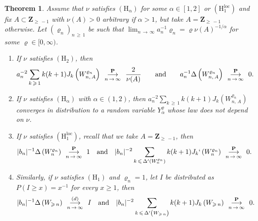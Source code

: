 \documentclass[10pt]{amsart}
\newtheorem{theo}{Theorem}[section]
\theoremstyle{definition}\newtheorem{defi}[theo]{Definition}\newtheorem{rema}[theo]{Remark}\newtheorem{exam}[theo]{Example}\newtheorem{exem}[theo]{Example}\newtheorem{nota}[theo]{Notation}
\newcommand{\ensembles}[1]{\mathbf{#1}}
\newcommand{\Z}{\ensembles{Z}}
\renewcommand{\P}{\ensembles{P}}
\newcommand{\1}{\ensembles{1}}
\renewcommand{\le}{\leqslant}
\renewcommand{\ge}{\geqslant}
\newcommand{\Hrm}{\mathrm{H}}
\newcommand{\Hrmloc}{\mathrm{(H_1^{loc})}}
\newcommand{\Hrmalp}{\mathrm{(H_\alpha)}}
\newcommand{\cvloi}[1][n]{\enskip\mathop{\longrightarrow}^{(d)}_{#1\,\to\, \infty}\enskip}
\newcommand{\cvproba}[1][n]{\enskip\mathop{\longrightarrow}^{\P}_{#1\,\to\, \infty}\enskip}
\providecommand{\?}{}
\begin{document}
\begin{theo}\label{thm:GW}
Assume that $\nu$ satisfies $\Hrmalp$ for some $\alpha \in [1, 2]$ or $\Hrmloc$ and fix $A \subset \Z_{\ge\,-1}$ with $\nu(A) > 0$ arbitrary if $\alpha>1$, but take $A = \Z_{\ge\,-1}$ otherwise. Let $(\varrho_n)_{n\,\ge\,1}$ be such that $\lim_{n\,\to\,\infty} a_n^{-1} \varrho_n = \varrho \nu(A)^{-1/\alpha}$ for some $\varrho \in [0, \infty)$.
\begin{enumerate}
\item\label{thm:GW_Gaussien}
If $\nu$ satisfies $(\Hrm_2)$, then
\[
a_n^{-2} \sum_{k\,\ge\,1} k (k+1) J_k\left(W^{\varrho_n}_{n,\,A}\right) \cvproba \frac{2}{\nu(A)}
\qquad\text{and}\qquad a_n^{-1} \Delta\left(W^{\varrho_n}_{n,\,A}\right) \cvproba 0.
\]

\item\label{thm:GW_stable}
If $\nu$ satisfies $\Hrmalp$ with $\alpha \in (1,2)$, then $a_n^{-2} \sum_{k\,\ge\,1} k (k+1) J_k(W^{\varrho_n}_{n,\,A})$ converges in distribution to a random variable $Y_\alpha^\varrho$ whose law does not depend on $\nu$.

\item\label{thm:GW_Cauchy_loc}
If $\nu$ satisfies $\Hrmloc$, recall that we take $A = \Z_{\ge\,-1}$, then
\[
|b_n|^{-1} \Delta\left(W^{\varrho_n}_n\right) \cvproba 1
\quad\text{and}\quad |b_n|^{-2} \sum_{k\,\le\, \Delta'\left(W^{\varrho_n}_n\right)} k (k+1) J_k`\left(W^{\varrho_n}_n\right) \cvproba 0.
\]

\item\label{thm:GW_Cauchy_gen}
Similarly, if $\nu$ satisfies $(\Hrm_1)$ and $\varrho_n = 1$, let $I$ be distributed as $P(I \ge x) = x^{-1}$ for every $x \ge 1$, then
\[
|b_n|^{-1} \Delta\left(W_{\ge\,n}\right) \cvloi I
\quad\text{and}\quad |b_n|^{-2} \sum_{k\,\le\, \Delta'\left(W_{\ge\,n}\right)} k (k+1) J_k\left(W_{\ge\,n}\right) \cvproba 0.
\]
\end{enumerate}
\end{theo}
\end{document}
